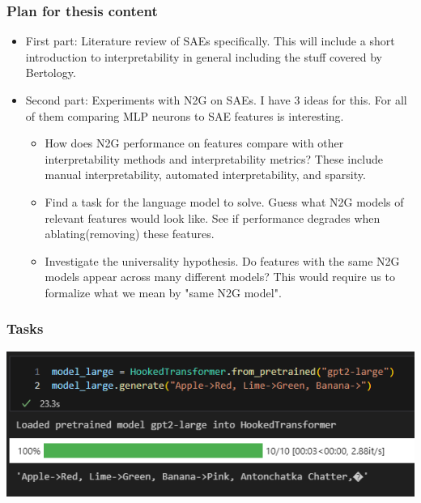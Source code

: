 \documentclass[aspectratio=169]{beamer}
\begin{document}
\begin{frame}[fragile=singleslide]
    \frametitle{Plan for thesis content}
    \begin{itemize}
        \item First part: Literature review of SAEs specifically.
        This will include a short introduction to interpretability in general including the stuff covered by Bertology.
        \item Second part: Experiments with N2G on SAEs.
        I have 3 ideas for this. 
        For all of them comparing MLP neurons to SAE features is interesting.
        \begin{itemize}
            \item How does N2G performance on features compare with other interpretability methods and interpretability metrics?
            These include manual interpretability, automated interpretability, and sparsity.
            \item Find a task for the language model to solve. 
            Guess what N2G models of relevant features would look like.
            See if performance degrades when ablating(removing) these features.
            \item Investigate the universality hypothesis.
            Do features with the same N2G models appear across many different models?
            This would require us to formalize what we mean by "same N2G model".
        \end{itemize}
    \end{itemize}
\end{frame}
\begin{frame}[fragile=singleslide]
    \frametitle{Tasks}
    \begin{center}
        \includegraphics[scale=0.6]{images/fruit_colors.png}
    \end{center}
\end{frame}
\end{document}
